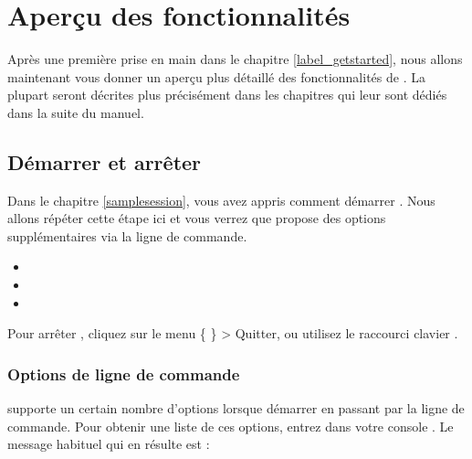 \chapter{Aperçu des fonctionnalités}\label{feature_glance}

Après une première prise en main dans le chapitre \ref{label_getstarted}, nous allons maintenant vous donner un aperçu plus détaillé des fonctionnalités de \qg. La plupart seront décrites plus précisément dans les chapitres qui leur sont dédiés dans la suite du manuel.

\section{Démarrer et arrêter \qg}\label{label_starting}

Dans le chapitre \ref{samplesession}, vous avez appris comment démarrer \qg. Nous allons répéter cette étape ici et vous verrez que \qg propose des options supplémentaires via la ligne de commande.

\begin{itemize}[label=--]
\item {} 
\item {}
\item {}
\end{itemize} 

Pour arrêter \qg, cliquez sur le menu \{\nix{} \osx{\qg}\} > Quitter, ou utilisez le raccourci clavier .

\subsection{Options de ligne de commande}
\label{label_commandline}

\nix \qg supporte un certain nombre d'options lorsque démarrer en passant par la ligne de commande. Pour obtenir une liste de ces options, entrez dans votre console . Le message habituel qui en résulte est :


